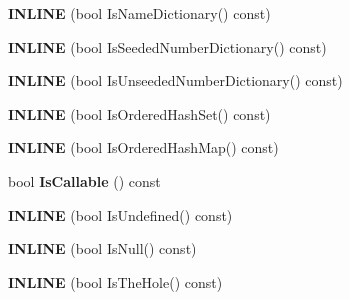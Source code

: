 \begin{DoxyCompactItemize}
\item 
\hypertarget{classv8_1_1internal_1_1_object_a022811a4a620c7167242779473bb3694}{}{\bfseries I\+N\+L\+I\+N\+E} (bool Is\+Name\+Dictionary() const)\label{classv8_1_1internal_1_1_object_a022811a4a620c7167242779473bb3694}

\item 
\hypertarget{classv8_1_1internal_1_1_object_a3f2cc2f35d751ed51dce8e64196d43b6}{}{\bfseries I\+N\+L\+I\+N\+E} (bool Is\+Seeded\+Number\+Dictionary() const)\label{classv8_1_1internal_1_1_object_a3f2cc2f35d751ed51dce8e64196d43b6}

\item 
\hypertarget{classv8_1_1internal_1_1_object_a683f47b770c8468d1dacf09d82ea2093}{}{\bfseries I\+N\+L\+I\+N\+E} (bool Is\+Unseeded\+Number\+Dictionary() const)\label{classv8_1_1internal_1_1_object_a683f47b770c8468d1dacf09d82ea2093}

\item 
\hypertarget{classv8_1_1internal_1_1_object_aafc8544f68c68c61767e4afb8ebd7258}{}{\bfseries I\+N\+L\+I\+N\+E} (bool Is\+Ordered\+Hash\+Set() const)\label{classv8_1_1internal_1_1_object_aafc8544f68c68c61767e4afb8ebd7258}

\item 
\hypertarget{classv8_1_1internal_1_1_object_a287586449fda9729a2a0da492bae1c0e}{}{\bfseries I\+N\+L\+I\+N\+E} (bool Is\+Ordered\+Hash\+Map() const)\label{classv8_1_1internal_1_1_object_a287586449fda9729a2a0da492bae1c0e}

\item 
\hypertarget{classv8_1_1internal_1_1_object_a82955fba5baa12821f08545c930c5aac}{}bool {\bfseries Is\+Callable} () const \label{classv8_1_1internal_1_1_object_a82955fba5baa12821f08545c930c5aac}

\item 
\hypertarget{classv8_1_1internal_1_1_object_a34fbd210244bd7dbe1d06f3a3533d7fc}{}{\bfseries I\+N\+L\+I\+N\+E} (bool Is\+Undefined() const)\label{classv8_1_1internal_1_1_object_a34fbd210244bd7dbe1d06f3a3533d7fc}

\item 
\hypertarget{classv8_1_1internal_1_1_object_acbfc534d829ede135c6828d324ae460c}{}{\bfseries I\+N\+L\+I\+N\+E} (bool Is\+Null() const)\label{classv8_1_1internal_1_1_object_acbfc534d829ede135c6828d324ae460c}

\item 
\hypertarget{classv8_1_1internal_1_1_object_acd35121e67cdc923c7455617461dcbcb}{}{\bfseries I\+N\+L\+I\+N\+E} (bool Is\+The\+Hole() const)\label{classv8_1_1internal_1_1_object_acd35121e67cdc923c7455617461dcbcb}


\end{DoxyCompactItemize}

